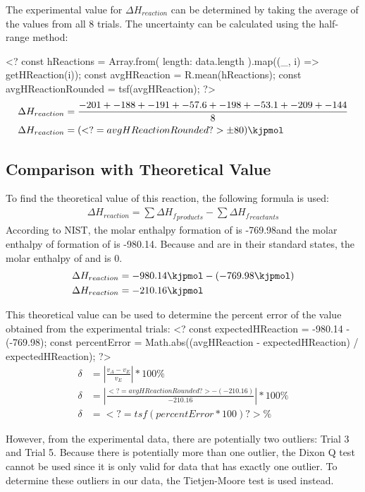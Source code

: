 \documentclass[12pt, notitlepage, letterpaper]{report}
\begin{document}
The experimental value for $\Delta H_{reaction}$ can be determined by taking the average of the values from all 8 trials. The uncertainty can be calculated using the half-range method:
\vspace{5pt}

<?
const hReactions = Array.from({ length: data.length }).map((_, i) => getHReaction(i));
const avgHReaction = R.mean(hReactions);
const avgHReactionRounded = tsf(avgHReaction);
?>
%
\begin{align*}
	\Delta H_{reaction} & = \frac{-201 + -188 + -191 + -57.6 + -198 + -53.1 + -209 + -144}{8} \\
	\Delta H_{reaction} & = (<?= avgHReactionRounded ?> \pm 80)\kjpmol
\end{align*}

\subsection*{Comparison with Theoretical Value}
To find the theoretical value of this reaction, the following formula is used:
%
\begin{align*}
	\Delta H_{reaction} = \sum \Delta {H_f}_{products} - \sum \Delta {H_f}_{reactants}
\end{align*}
%
According to NIST, the molar enthalpy formation of  is -769.98\kjpmol and the molar enthalpy of formation of  is -980.14\kjpmol . Because  and  are in their standard states, the molar enthalpy of  and  is 0\kjpmol .
\begin{align*}
	\Delta H_{reaction} & = -980.14\kjpmol - (-769.98\kjpmol) \\
	\Delta H_{reaction} & = -210.16\kjpmol
\end{align*}

This theoretical value can be used to determine the percent error of the value obtained from the experimental trials:
%
<?
const expectedHReaction = -980.14 - (-769.98);
const percentError = Math.abs((avgHReaction - expectedHReaction) / expectedHReaction);
?>
%
\begin{align*}
	\delta & = |\frac{v_A - v_E}{v_E}| * 100\%                                  \\
	\delta & = |\frac{<?= avgHReactionRounded ?> - (-210.16)}{-210.16}| * 100\% \\
	\delta & = <?= tsf(percentError * 100) ?>\%
\end{align*}

However, from the experimental data, there are potentially two outliers: Trial 3 and Trial 5. Because there is potentially more than one outlier, the Dixon Q test cannot be used since it is only valid for data that has exactly one outlier. To determine these outliers in our data, the Tietjen-Moore test is used instead.
\end{document}
